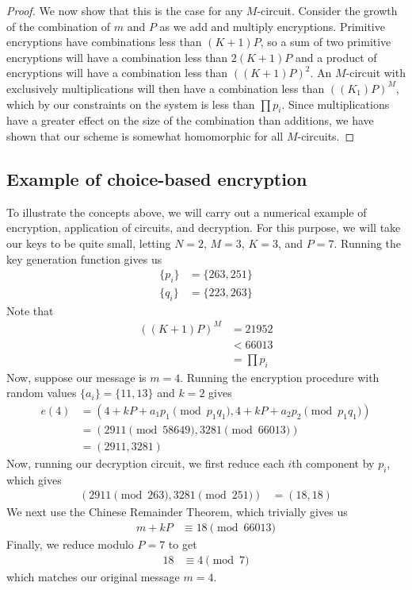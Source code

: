 \documentclass[11pt]{report}
\begin{document}
\begin{proof}
We now show that this is the case for any $M$-circuit. Consider the growth of the combination of $m$ and $P$ as we add and multiply encryptions. Primitive encryptions have combinations less than $(K+1)P$, so a sum of two primitive encryptions will have a combination less than $2(K+1)P$ and a product of encryptions will have a combination less than $((K+1)P)^2$. An $M$-circuit with exclusively multiplications will then have a combination less than $((K_1)P)^M$, which by our constraints on the system is less than $\prod p_i$. Since multiplications have a greater effect on the size of the combination than additions, we have shown that our scheme is somewhat homomorphic for all $M$-circuits.

\end{proof}


\subsection{Example of choice-based encryption}
\label{sec:cbe_example}

To illustrate the concepts above, we will carry out a numerical example of encryption, application of circuits, and decryption. For this purpose, we will take our keys to be quite small, letting $N=2$, $M=3$, $K=3$, and $P=7$. Running the key generation function gives us
\begin{align*}
\{p_i\} &= \{263,251\}\\
\{q_i\} &= \{223,263\}
\end{align*}
Note that
\begin{align*}
((K+1)P)^M &= 21952\\
&< 66013\\
&= \prod p_i
\end{align*}
Now, suppose our message is $m=4$. Running the encryption procedure with random values $\{a_i\} = \{11,13\}$ and $k=2$ gives
\begin{align*}
e(4) &= (4+kP+a_1p_1 \pmod{p_1q_1},4+kP+a_2p_2\pmod{p_1q_1}) \\
&= (2911 \pmod{58649}, 3281 \pmod{66013})\\
&= (2911, 3281)
\end{align*}
Now, running our decryption circuit, we first reduce each $i$th component by $p_i$, which gives
\begin{align*}
(2911 \pmod{263}, 3281 \pmod{251}) &= (18,18)
\end{align*}
We next use the Chinese Remainder Theorem, which trivially gives us
\begin{align*}
m+kP &\equiv 18 \pmod{66013}
\end{align*}
Finally, we reduce modulo $P=7$ to get
\begin{align*}
18 &\equiv 4 \pmod{7}
\end{align*}
which matches our original message $m=4$.
\end{document}
